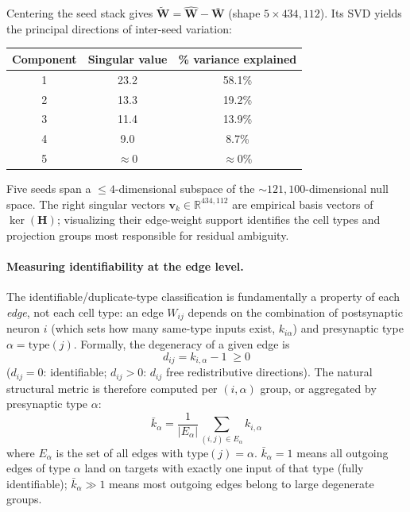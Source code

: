 \documentclass[11pt,a4paper]{article}
\begin{document}
Centering the seed stack gives $\tilde{\mathbf{W}} = \hat{\mathbf{W}} -
\bar{\mathbf{W}}$ (shape $5\times 434{,}112$).  Its SVD yields the principal
directions of inter-seed variation:
\begin{center}
\begin{tabular}{ccc}
\toprule
Component & Singular value & \% variance explained \\
\midrule
1 & 23.2 & 58.1\% \\
2 & 13.3 & 19.2\% \\
3 & 11.4 & 13.9\% \\
4 &  9.0 &  8.7\% \\
5 & $\approx 0$ & $\approx 0\%$ \\
\bottomrule
\end{tabular}
\end{center}
Five seeds span a $\leq 4$-dimensional subspace of the
$\sim 121{,}100$-dimensional null space.  The right singular vectors
$\mathbf{v}_k \in \mathbb{R}^{434{,}112}$ are empirical basis vectors of
$\ker(\mathbf{H})$; visualizing their edge-weight support identifies the cell
types and projection groups most responsible for residual ambiguity.

\paragraph{Measuring identifiability at the edge level.}

The identifiable/duplicate-type classification is fundamentally a property of
each \emph{edge}, not each cell type: an edge $W_{ij}$ depends on the
combination of postsynaptic neuron $i$ (which sets how many same-type inputs
exist, $k_{i\alpha}$) and presynaptic type $\alpha = \mathrm{type}(j)$.
Formally, the degeneracy of a given edge is
\begin{equation}
d_{ij} = k_{i,\alpha} - 1 \;\geq 0
\end{equation}
($d_{ij}=0$: identifiable; $d_{ij}>0$: $d_{ij}$ free redistributive
directions).  The natural structural metric is therefore computed per
$(i, \alpha)$ group, or aggregated by presynaptic type $\alpha$:
\begin{equation}
\bar{k}_\alpha = \frac{1}{|E_\alpha|}
\sum_{(i,j)\in E_\alpha} k_{i,\alpha}
\end{equation}
where $E_\alpha$ is the set of all edges with $\mathrm{type}(j) = \alpha$.
$\bar{k}_\alpha = 1$ means all outgoing edges of type $\alpha$ land on targets
with exactly one input of that type (fully identifiable); $\bar{k}_\alpha \gg 1$
means most outgoing edges belong to large degenerate groups.
\end{document}
